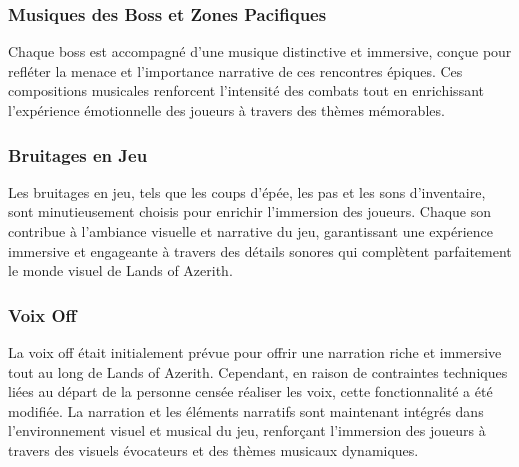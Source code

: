 \subsubsection{Musiques des Boss et Zones Pacifiques}

Chaque boss est accompagné d'une musique distinctive et immersive, conçue pour refléter la menace et l'importance narrative de ces rencontres épiques. 
Ces compositions musicales renforcent l'intensité des combats tout en enrichissant l'expérience émotionnelle des joueurs à travers des thèmes mémorables.

\subsubsection{Bruitages en Jeu}

Les bruitages en jeu, tels que les coups d'épée, les pas et les sons d'inventaire, sont minutieusement choisis pour enrichir l'immersion des joueurs. 
Chaque son contribue à l'ambiance visuelle et narrative du jeu, garantissant une expérience immersive et engageante à travers des détails sonores qui complètent parfaitement le monde visuel de Lands of Azerith.
\\

\subsubsection{Voix Off}

La voix off était initialement prévue pour offrir une narration riche et immersive tout au long de Lands of Azerith. 
Cependant, en raison de contraintes techniques liées au départ de la personne censée réaliser les voix, cette fonctionnalité a été modifiée. 
La narration et les éléments narratifs sont maintenant intégrés dans l'environnement visuel et musical du jeu, renforçant l'immersion des joueurs à travers des visuels évocateurs et des thèmes musicaux dynamiques.
